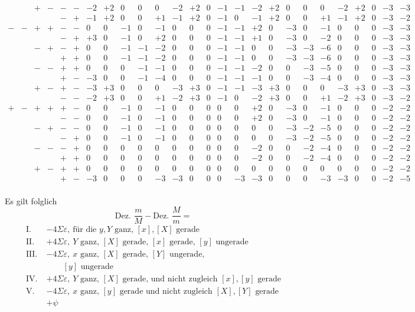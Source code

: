 \[\begin{array}{cccccc|rrrrr|rrrrr|rrrrr|rrrrr}
&&+&-&-&-&-2&+2&0&0&0&-2&+2&0&-1&-1&-2&+2&0&0&0&-2&+2&0&-3&-3\\
&&&&-&+&-1&+2&0&0&+1&-1&+2&0&-1&0&-1&+2&0&0&+1&-1&+2&0&-3&-2\\[4pt]
-&-&+&+&-&-&0&0&-1&0&-1&0&0&0&-1&-1&+2&0&-3&0&-1&0&0&0&-3&-3\\
&&&&-&+&+3&0&-1&0&+2&0&0&0&-1&-1&+1&0&-3&0&-2&0&0&0&-3&-3\\
&&-&+&-&+&0&0&-1&-1&-2&0&0&0&-1&-1&0&0&-3&-3&-6&0&0&0&-3&-3\\
&&&&+&+&0&0&-1&-1&-2&0&0&0&-1&-1&0&0&-3&-3&-6&0&0&0&-3&-3\\
&&-&-&+&+&0&0&0&-1&-1&0&0&0&-1&-1&-2&0&0&-3&-5&0&0&0&-3&-3\\
&&&&+&-&-3&0&0&-1&-4&0&0&0&-1&-1&-1&0&0&-3&-4&0&0&0&-3&-3\\
&&+&-&+&-&-3&+3&0&0&0&-3&+3&0&-1&-1&-3&+3&0&0&0&-3&+3&0&-3&-3\\
&&&&-&-&-2&+3&0&0&+1&-2&+3&0&-1&0&-2&+3&0&0&+1&-2&+3&0&-3&-2\\[4pt]
+&-&+&+&+&-&0&0&-1&0&-1&0&0&0&0&0&+2&0&-3&0&-1&0&0&0&-2&-2\\
&&&&-&-&0&0&-1&0&-1&0&0&0&0&0&+2&0&-3&0&-1&0&0&0&-2&-2\\
&&-&+&-&-&0&0&-1&0&-1&0&0&0&0&0&0&0&-3&-2&-5&0&0&0&-2&-2\\
&&&&-&+&0&0&-1&0&-1&0&0&0&0&0&0&0&-3&-2&-5&0&0&0&-2&-2\\
&&-&-&-&+&0&0&0&0&0&0&0&0&0&0&-2&0&0&-2&-4&0&0&0&-2&-2\\
&&&&+&+&0&0&0&0&0&0&0&0&0&0&-2&0&0&-2&-4&0&0&0&-2&-2\\
&&+&-&+&+&0&0&0&0&0&0&0&0&0&0&0&0&0&0&0&0&0&0&-2&-2\\
&&&&+&-&-3&0&0&0&-3&-3&0&0&0&-3&-3&0&0&0&-3&-3&0&0&-2&-5\\
\end{array}
\]
\endgroup

\clearpage
{}
Es gilt folglich
\[
\text{Dez. }\frac mM-\text{Dez. }\frac Mm=
\]
\[
\begin{aligned}
\mathrm{I.}\;&-4\Sigma\varepsilon,\ \text{für die }y,Y\text{ ganz, }[x],[X]\text{ gerade}\\
\mathrm{II.}\;&+4\Sigma\varepsilon,\ Y\text{ ganz, }[X]\text{ gerade, }[x]\text{ gerade, }[y]\text{ ungerade}\\
\mathrm{III.}\;&-4\Sigma\varepsilon,\ x\text{ ganz, }[X]\text{ gerade, }[Y]\text{ ungerade,}\\
&\qquad [y]\text{ ungerade}\\
\mathrm{IV.}\;&+4\Sigma\varepsilon,\ Y\text{ ganz, }[X]\text{ gerade, und nicht zugleich }[x],[y]\text{ gerade}\\
\mathrm{V.}\;&-4\Sigma\varepsilon,\ x\text{ ganz, }[y]\text{ gerade und nicht zugleich }[X],[Y]\text{ gerade}\\
&+\psi
\end{aligned}
\]

